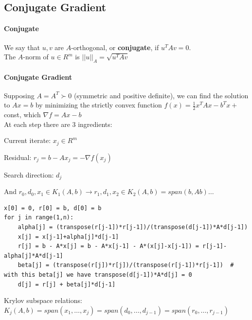 \documentclass[10pt]{report}
\begin{document}
\subsection{Conjugate Gradient}
\paragraph{Conjugate} We say that $u,v$ are $A$-orthogonal, or \textbf{conjugate}, if $u^TAv = 0$.\\
The $A$-norm of $u\in R^m$ is $||u||_A = \sqrt{u^TAv}$
\paragraph{Conjugate Gradient} Supposing $A=A^T \succ 0$ (symmetric and positive definite), we can find the solution to $Ax = b$ by minimizing the strictly convex function $f(x) = \frac{1}{2}x^TAx-b^Tx +$ const, which $\nabla f = Ax-b$\\
At each step there are 3 ingredients:
\begin{list}{}{}
	\item Current iterate: $x_j\in R^m$
	\item Residual: $r_j = b-Ax_j = -\nabla f(x_j)$ 
	\item Search direction: $d_j$
\end{list}
And $r_0,d_0,x_1\in K_1(A,b) \rightarrow r_1,d_1,x_2\in K_2(A,b)=span(b,Ab)\ldots$
\begin{lstlisting}[style=myPython]
x[0] = 0, r[0] = b, d[0] = b
for j in range(1,n):
	alpha[j] = (transpose(r[j-1])*r[j-1])/(transpose(d[j-1])*A*d[j-1])
	x[j] = x[j-1]+alpha[j]*d[j-1]
	r[j] = b - A*x[j] = b - A*x[j-1] - A*(x[j]-x[j-1]) = r[j-1]-alpha[j]*A*d[j-1]
	beta[j] = (transpose(r[j])*r[j])/(transpose(r[j-1])*r[j-1])  # with this beta[j] we have transpose(d[j-1])*A*d[j] = 0
	d[j] = r[j] + beta[j]*d[j-1]
\end{lstlisting}
Krylov subspace relations: $K_j(A,b) = span(x_1,\ldots,x_j) = span(d_0,\ldots,d_{j-1}) = span(r_0,\ldots,r_{j-1})$
\end{document}
